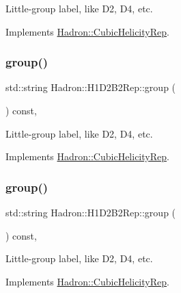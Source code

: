 Little-\/group label, like D2, D4, etc. 

Implements \mbox{\hyperlink{structHadron_1_1CubicHelicityRep_a101a7d76cd8ccdad0f272db44b766113}{Hadron\+::\+Cubic\+Helicity\+Rep}}.

\mbox{\label{structHadron_1_1H1D2B2Rep_ab0fa365d2ca739de8c62328e3e053deb}} 
\subsubsection{\texorpdfstring{group()}{group()}\hspace{0.1cm}{\footnotesize\ttfamily [3/5]}}
{\footnotesize\ttfamily std\+::string Hadron\+::\+H1\+D2\+B2\+Rep\+::group (\begin{DoxyParamCaption}{ }\end{DoxyParamCaption}) const\hspace{0.3cm}{\ttfamily [inline]}, {\ttfamily [virtual]}}

Little-\/group label, like D2, D4, etc. 

Implements \mbox{\hyperlink{structHadron_1_1CubicHelicityRep_a101a7d76cd8ccdad0f272db44b766113}{Hadron\+::\+Cubic\+Helicity\+Rep}}.

\mbox{\label{structHadron_1_1H1D2B2Rep_ab0fa365d2ca739de8c62328e3e053deb}} 
\subsubsection{\texorpdfstring{group()}{group()}\hspace{0.1cm}{\footnotesize\ttfamily [4/5]}}
{\footnotesize\ttfamily std\+::string Hadron\+::\+H1\+D2\+B2\+Rep\+::group (\begin{DoxyParamCaption}{ }\end{DoxyParamCaption}) const\hspace{0.3cm}{\ttfamily [inline]}, {\ttfamily [virtual]}}

Little-\/group label, like D2, D4, etc. 

Implements \mbox{\hyperlink{structHadron_1_1CubicHelicityRep_a101a7d76cd8ccdad0f272db44b766113}{Hadron\+::\+Cubic\+Helicity\+Rep}}.

\mbox{\label{structHadron_1_1H1D2B2Rep_ab0fa365d2ca739de8c62328e3e053deb}} 
